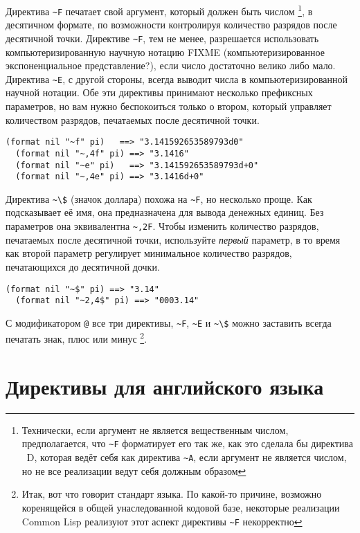 Директива \lstinline!~F! печатает свой аргумент, который должен быть числом
\footnote{Технически, если аргумент не является вещественным числом, предполагается, что
  \lstinline!~F! форматирует его так же, как это сделала бы директива ~D, которая ведёт
  себя как директива \lstinline!~A!, если аргумент не является числом, но не все
  реализации ведут себя должным образом}, в десятичном формате, по возможности контролируя
количество разрядов после десятичной точки. Директиве \lstinline!~F!, тем не менее,
разрешается использовать компьютеризированную научную нотацию FIXME (компьютеризированное
экспоненциальное представление?), если число достаточно велико либо мало. Директива
\lstinline!~E!, с другой стороны, всегда выводит числа в компьютеризированной научной
нотации. Обе эти директивы принимают несколько префиксных параметров, но вам нужно
беспокоиться только о втором, который управляет количеством разрядов, печатаемых после
десятичной точки.

\begin{lstlisting}[style=lisprepl]
  (format nil "~f" pi)   ==> "3.141592653589793d0"
  (format nil "~,4f" pi) ==> "3.1416"
  (format nil "~e" pi)   ==> "3.141592653589793d+0"
  (format nil "~,4e" pi) ==> "3.1416d+0"
\end{lstlisting}

Директива \lstinline!~\$! (значок доллара) похожа на \lstinline!~F!, но несколько
проще. Как подсказывает её имя, она предназначена для вывода денежных единиц. Без
параметров она эквивалентна \lstinline!~,2F!. Чтобы изменить количество разрядов,
печатаемых после десятичной точки, используйте \textit{первый} параметр, в то время как
второй параметр регулирует минимальное количество разрядов, печатающихся до десятичной
дочки.

\begin{lstlisting}[style=lisprepl]
  (format nil "~$" pi) ==> "3.14"
  (format nil "~2,4$" pi) ==> "0003.14"
\end{lstlisting}

С модификатором \lstinline!@! все три директивы, \lstinline!~F!, \lstinline!~E! и
\lstinline!~\$! можно заставить всегда печатать знак, плюс или минус \footnote{Итак, вот
  что говорит стандарт языка. По какой-то причине, возможно коренящейся в общей
  унаследованной кодовой базе, некоторые реализации Common Lisp реализуют этот аспект
  директивы \lstinline!~F! некорректно}.

\section{Директивы для английского языка}

